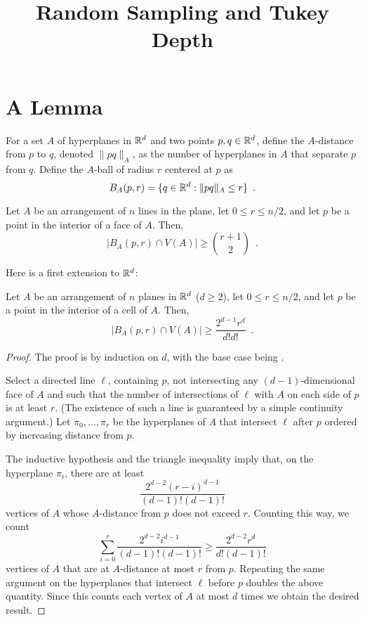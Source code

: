 \documentclass{article}
\title{Random Sampling and Tukey Depth}
\begin{document}
\maketitle

\section{A Lemma}
For a set $A$ of hyperplanes in $\mathbb{R}^d$ and two points $p,q\in\mathbb{R}^d$,
define the $A$-distance from $p$ to $q$, denoted $\|pq\|_A$, as the
number of hyperplanes in $A$ that separate $p$ from $q$.  Define the
$A$-ball of radius $r$ centered at $p$ as
\[ 
   B_A(p,r) = \{q\in\mathbb{R}^d : \|pq\|_A \le r\} \enspace .
\]

\begin{lem}
Let $A$ be an arrangement of $n$ lines in the plane, let $0\le r\le
n/2$, and let $p$ be a point in the interior of a face of $A$.  Then,
\[
    |B_A(p,r) \cap V(A)| \ge {r+1 \choose 2} \enspace .
\]
\end{lem}

Here is a first extension to $\mathbb{R}^d$:
\begin{lem}
Let $A$ be an arrangement of $n$ planes in $\mathbb{R}^d$ ($d\ge 2$),  let
$0\le r\le n/2$, and let $p$ be a point in the interior of a cell of
$A$.  Then,
\[
    |B_A(p,r) \cap V(A)| \ge \frac{2^{d-1}r^d}{d!d!} \enspace .
\]
\end{lem}
\begin{proof}
The proof is by induction on $d$, with the base case being
.

Select a directed line $\ell$, containing $p$, not intersecting any
$(d-1)$-dimensional face of $A$ and such that the number of 
intersections of $\ell$ with
$A$ on each side of $p$ is at least $r$.  (The existence of such a
line is guaranteed by a simple continuity argument.)  Let
$\pi_0,\ldots,\pi_{r}$ be the hyperplanes of $A$ that intersect 
$\ell$ after $p$ ordered by increasing distance from $p$.

The inductive hypothesis and the triangle inequality imply that, on
the hyperplane
$\pi_i$, there are at least
\[
  \frac{2^{d-2}(r-i)^{d-1}}{(d-1)!(d-1)!} 
\]
vertices of $A$ whose $A$-distance from $p$ does not exceed $r$.
Counting this way, we count 
\[
  \sum_{i=0}^r \frac{2^{d-2}i^{d-1}}{(d-1)!(d-1)!} 
     \ge \frac{2^{d-2}r^{d}}{d!(d-1)!}
\]
vertices of $A$ that are at $A$-distance at most $r$ from $p$.
Repeating the same argument on the hyperplanes
that intersect $\ell$
before $p$ doubles the above quantity.  Since this counts each vertex
of $A$ at most $d$ times we obtain the desired result.
\end{proof}
\end{document}
